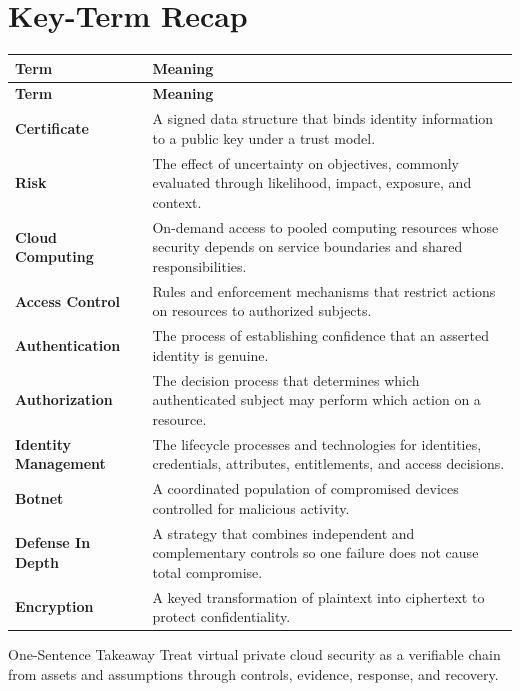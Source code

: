 \documentclass[11pt,letterpaper]{article}
\begin{document}
\section*{Key-Term Recap}
\begin{longtable}{>{\RaggedRight\arraybackslash}p{}>{\RaggedRight\arraybackslash}p{}}
\toprule\rowcolor{Navy}\color{white}\textbf{Term} & \color{white}\textbf{Meaning}\\\midrule
\endfirsthead
\toprule\rowcolor{Navy}\color{white}\textbf{Term} & \color{white}\textbf{Meaning}\\\midrule
\endhead
\textbf{Certificate} & A signed data structure that binds identity information to a public key under a trust model. \\\midrule
\textbf{Risk} & The effect of uncertainty on objectives, commonly evaluated through likelihood, impact, exposure, and context. \\\midrule
\textbf{Cloud Computing} & On-demand access to pooled computing resources whose security depends on service boundaries and shared responsibilities. \\\midrule
\textbf{Access Control} & Rules and enforcement mechanisms that restrict actions on resources to authorized subjects. \\\midrule
\textbf{Authentication} & The process of establishing confidence that an asserted identity is genuine. \\\midrule
\textbf{Authorization} & The decision process that determines which authenticated subject may perform which action on a resource. \\\midrule
\textbf{Identity Management} & The lifecycle processes and technologies for identities, credentials, attributes, entitlements, and access decisions. \\\midrule
\textbf{Botnet} & A coordinated population of compromised devices controlled for malicious activity. \\\midrule
\textbf{Defense In Depth} & A strategy that combines independent and complementary controls so one failure does not cause total compromise. \\\midrule
\textbf{Encryption} & A keyed transformation of plaintext into ciphertext to protect confidentiality. \\\midrule
\bottomrule
\end{longtable}
\begin{CornellExamBox}{One-Sentence Takeaway}
Treat virtual private cloud security as a verifiable chain from assets and assumptions through controls, evidence, response, and recovery.
\end{CornellExamBox}
\end{document}
